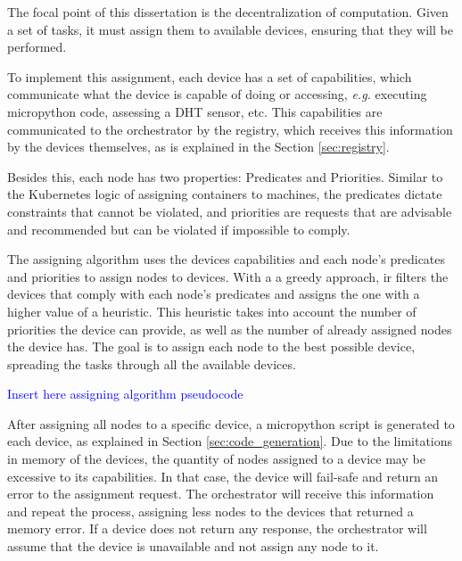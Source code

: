The focal point of this dissertation is the decentralization of computation. Given a set of tasks, it must assign them to available devices, ensuring that they will be performed.

To implement this assignment, each device has a set of capabilities, which communicate what the device is capable of doing or accessing, \textit{e.g.} executing micropython code, assessing a DHT sensor, etc. This capabilities are communicated to the orchestrator by the registry, which receives this information by the devices themselves, as is explained in the Section \ref{sec:registry}. 

Besides this, each node has two properties: Predicates and Priorities. Similar to the Kubernetes logic of assigning containers to machines, the predicates dictate constraints that cannot be violated, and priorities are requests that are advisable and recommended but can be violated if impossible to comply. 

The assigning algorithm uses the devices capabilities and each node's predicates and priorities to assign nodes to devices. With a a greedy approach, ir filters the devices that comply with each node's predicates and assigns the one with a higher value of a heuristic. This heuristic takes into account the number of priorities the device can provide, as well as the number of already assigned nodes the device has. The goal is to assign each node to the best possible device, spreading the tasks through all the available devices.

\textcolor{blue}{Insert here assigning algorithm pseudocode}

    
    

After assigning all nodes to a specific device, a micropython script is generated to each device, as explained in Section \ref{sec:code_generation}. Due to the limitations in memory of the devices, the quantity of nodes assigned to a device may be excessive to its capabilities. In that case, the device will fail-safe and return an error to the assignment request. The orchestrator will receive this information and repeat the process, assigning less nodes to the devices that returned a memory error. If a device does not return any response, the orchestrator will assume that the device is unavailable and not assign any node to it.


